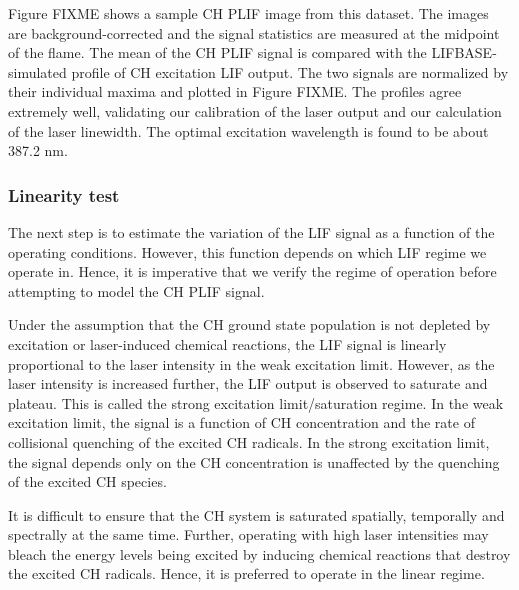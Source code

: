 Figure FIXME shows a sample CH PLIF image from this dataset.
The images are background-corrected and the signal statistics are measured at the midpoint of the flame.
The mean of the CH PLIF signal is compared with the LIFBASE-simulated profile of CH excitation LIF output.
The two signals are normalized by their individual maxima and plotted in Figure FIXME.
The profiles agree extremely well, validating our calibration of the laser output and our calculation of the laser linewidth.
The optimal excitation wavelength is found to be about 387.2 nm.

\subsubsection{Linearity test}

The next step is to estimate the variation of the LIF signal as a function of the operating conditions.
However, this function depends on which LIF regime we operate in.
Hence, it is imperative that we verify the regime of operation before attempting to model the CH PLIF signal.

Under the assumption that the CH ground state population is not depleted by excitation or laser-induced chemical reactions, the LIF signal is linearly proportional to the laser intensity in the weak excitation limit.
However, as the laser intensity is increased further, the LIF output is observed to saturate and plateau.
This is called the strong excitation limit/saturation regime.
In the weak excitation limit, the signal is a function of CH concentration and the rate of collisional quenching of the excited CH radicals.
In the strong excitation limit, the signal depends only on the CH concentration is unaffected by the quenching of the excited CH species.

It is difficult to ensure that the CH system is saturated spatially, temporally and spectrally at the same time.
Further, operating with high laser intensities may bleach the energy levels being excited by inducing chemical reactions that destroy the excited CH radicals.
Hence, it is preferred to operate in the linear regime.

